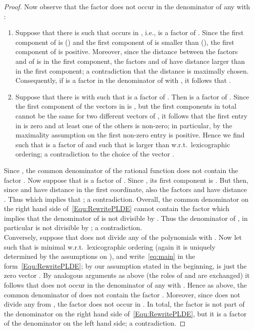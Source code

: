 \documentclass[a4paper]{sig-alternate}
\begin{document}
\begin{proof}
Now observe that the factor  does not occur in the denominator of any  with :
\begin{enumerate}
\item Suppose that there is  such that  occurs in , i.e.,  is a factor of . Since the first component of  is  () and the first component of  is smaller than  (), the first component of  is positive. Moreover, since the distance between the factors  and  of  is  in the first component, the factors  and  of  have distance larger than  in the first component; a contradiction that the distance  is maximally chosen. Consequently, if  is a factor
    in the denominator of  with , it follows that .
\item Suppose that there is  with  such that  is a factor of . Then  is a factor of . Since the first component of the vectors in  is , but the first  components in total cannot be the same for two different vectors of , it follows that the first entry in  is zero and at least one of the others is non-zero; in particular, by the maximality assumption on  the first non-zero entry is positive. Hence we find  such that  is a factor of  and such that  is larger than  w.r.t.\ lexicographic ordering; a contradiction to the choice of the vector .
\end{enumerate}
Since , the common denominator of the rational function
 does not contain the factor  .  Now suppose that  is a factor of . Since ,
its first component is . But then, since  and  have distance  in the first coordinate, also the factors  and  have distance . Thus
 which implies that ; a contradiction. Overall, the common denominator on the right hand side of~\eqref{Equ:RewritePLDE} cannot contain the factor  which implies that the denominator of  is not divisible by . Thus the denominator of , in particular  is not divisible by ; a contradiction.\\
 Conversely, suppose that  does not divide any of the polynomials  with . Now let  such that  is minimal w.r.t.\ lexicographic ordering (again it is uniquely determined by the assumptions on ), and write~\eqref{eq:main} in the form~\eqref{Equ:RewritePLDE}; by our assumption stated in the beginning,  is just the zero vector . By analogous arguments as above (the roles of  and  are exchanged) it follows that  does not occur in the denominator of any  with . Hence as above, the common denominator of
 does not contain the factor  . Moreover, since  does not divide any  from , the factor  does not occur in . In total, the factor  is not part of the denominator on the right hand side of~\eqref{Equ:RewritePLDE}, but it is a factor of the denominator on the left hand side; a
contradiction.
\end{proof}
\end{document}
